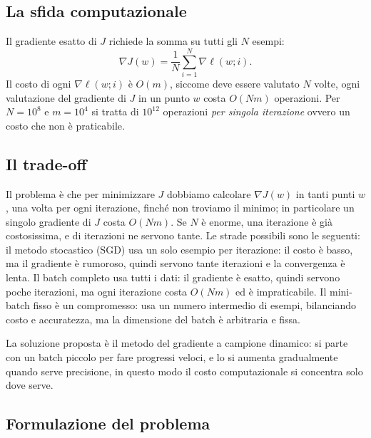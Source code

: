 \documentclass[a4paper,12pt]{article}
\numberwithin{equation}{section}
\numberwithin{figure}{section}
\numberwithin{table}{section}
\begin{document}
\subsection{La sfida computazionale}

Il gradiente esatto di $J$ richiede la somma su tutti gli $N$ esempi:
\[
  \nabla J(w) = \frac{1}{N}\sum_{i=1}^N \nabla \ell(w;i).
\]
Il costo di ogni $\nabla \ell(w;i)$ \`e $O(m)$, siccome deve essere valutato $N$ volte, ogni valutazione del gradiente di $J $ in un punto $ w $ costa $O(Nm)$ operazioni. Per $N=10^8$ e $m=10^4$ si tratta di $10^{12}$ operazioni \emph{per singola iterazione} ovvero un costo che non è praticabile.

\subsection{Il trade-off}

Il problema è che per minimizzare \(J\) dobbiamo calcolare \(\nabla J(w)\) in tanti punti \(w\), una volta per ogni iterazione, finché non troviamo il minimo; in particolare un singolo gradiente di \(J\) costa \(O(Nm)\). Se \(N\) è enorme, una iterazione è già costosissima, e di iterazioni ne servono tante. Le strade possibili sono le seguenti: il metodo stocastico (SGD) usa un solo esempio per iterazione: il costo è basso, ma il gradiente è rumoroso, quindi servono tante iterazioni e la convergenza è lenta.
Il batch completo usa tutti i dati: il gradiente è esatto, quindi servono poche iterazioni, ma ogni iterazione costa \(O(Nm)\) ed è impraticabile.
Il mini-batch fisso è un compromesso: usa un numero intermedio di esempi, bilanciando costo e accuratezza, ma la dimensione del batch è arbitraria e fissa.

La soluzione proposta è il metodo del gradiente a campione dinamico: si parte con un batch piccolo per fare progressi veloci, e lo si aumenta gradualmente quando serve precisione, in questo modo il costo computazionale si concentra solo dove serve.


\subsection{Formulazione del problema}
\end{document}
